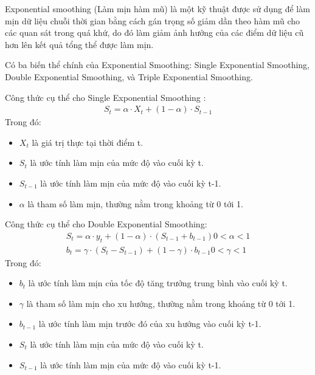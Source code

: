 \documentclass[conference]{IEEEtran}
\begin{document}
Exponential smoothing (Làm mịn hàm mũ) là một kỹ thuật được sử dụng để làm mịn dữ liệu chuỗi thời gian bằng cách gán trọng số giảm dần theo hàm mũ cho các quan sát trong quá khứ, do đó làm giảm ảnh hưởng của các điểm dữ liệu cũ hơn lên kết quả tổng thể được làm mịn.

Có ba biến thể chính của Exponential Smoothing: Single Exponential Smoothing, Double Exponential Smoothing, và Triple Exponential Smoothing.

Công thức cụ thể cho Single Exponential Smoothing \cite{HoltWinter2}:
\begin{align*}
S_t = \alpha \cdot X_t + (1 - \alpha) \cdot S_{t-1}
\end{align*}
Trong đó:
\begin{itemize}
    \item $X_t$ là giá trị thực tại thời điểm t.
    \item $S_t$ là ước tính làm mịn của mức độ vào cuối kỳ t.
    \item $S_{t-1}$ là ước tính làm mịn của mức độ vào cuối kỳ t-1.
    \item $\alpha$ là tham số làm mịn, thường nằm trong khoảng từ 0 tới 1.
\end{itemize}

Công thức cụ thể cho Double Exponential Smoothing:
\begin{align*}
S_t = \alpha \cdot y_t + (1 - \alpha) \cdot (S_{t-1} + b_{t-1}) 0 < α < 1
\\
b_t = \gamma \cdot (S_t - S_{t-1}) + (1 - \gamma) \cdot b_{t-1} 0 < γ < 1 
\end{align*}
Trong đó:
\begin{itemize}
\item $b_t$ là ước tính làm mịn của tốc độ tăng trưởng trung bình vào cuối kỳ t.
\item $\gamma$ là tham số làm mịn cho xu hướng, thường nằm trong khoảng từ 0 tới 1.
\item $b_{t-1}$ là ước tính làm mịn trước đó của xu hướng vào cuối kỳ t-1.
\item $S_t$ là ước tính làm mịn của mức độ vào cuối kỳ t.
\item $S_{t-1}$ là ước tính làm mịn của mức độ vào cuối kỳ t-1.
\end{itemize}
\end{document}
